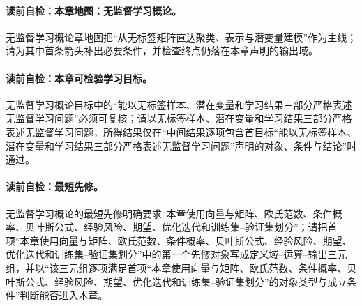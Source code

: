 \paragraph{读前自检：本章地图：无监督学习概论。}无监督学习概论章地图把“从无标签矩阵直达聚类、表示与潜变量建模”作为主线；请为其中首条箭头补出必要条件，并检查终点仍落在本章声明的输出域。\par

\label{struct:V4-C01-CH01}
\paragraph{读前自检：本章可检验学习目标。}无监督学习概论目标中的“能以无标签样本、潜在变量和学习结果三部分严格表述无监督学习问题”必须可复核；请以无标签样本、潜在变量和学习结果三部分严格表述无监督学习问题，所得结果仅在“中间结果逐项包含首目标“能以无标签样本、潜在变量和学习结果三部分严格表述无监督学习问题”声明的对象、条件与结论”时通过。\par


\label{struct:V4-C01-CH02}
\paragraph{读前自检：最短先修。}无监督学习概论的最短先修明确要求“本章使用向量与矩阵、欧氏范数、条件概率、贝叶斯公式、经验风险、期望、优化迭代和训练集--验证集划分”；请把首项“本章使用向量与矩阵、欧氏范数、条件概率、贝叶斯公式、经验风险、期望、优化迭代和训练集--验证集划分”中的第一个先修对象写成定义域--运算--输出三元组，并以“该三元组逐项满足首项“本章使用向量与矩阵、欧氏范数、条件概率、贝叶斯公式、经验风险、期望、优化迭代和训练集--验证集划分”的对象类型与成立条件”判断能否进入本章。\par

